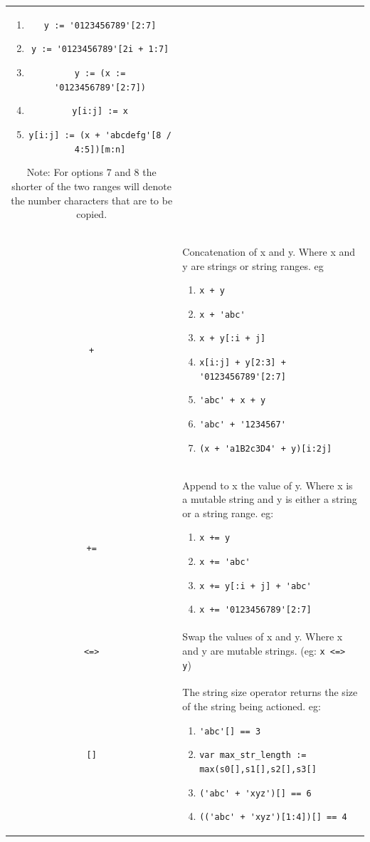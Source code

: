 \documentclass{book}
\def\lthtmlcheckvsize{\ifdim\ht\sizebox<\vsize 
  \ifdim\wd\sizebox<\hsize\expandafter\hfill\fi \expandafter\vfill
  \else\expandafter\vss\fi}%
\begin{document}
{\begin{tabular}{|c|p{}|}
\begin{enumerate}
\item\verb"y := '0123456789'[2:7]"
\item\verb"y := '0123456789'[2i + 1:7]"
\item\verb"y := (x := '0123456789'[2:7])"
\item\verb"y[i:j] := x"
\item\verb"y[i:j] := (x + 'abcdefg'[8 / 4:5])[m:n]"
\end{enumerate}
\par Note: For options 7 and 8 the shorter of the two ranges 
will denote the number characters that are to be copied.\\
\verb'+'&  Concatenation of x and y. Where x and y are strings or  
 string ranges. eg
 \begin{enumerate}
\item\verb"x + y"
\item\verb"x + 'abc'"
\item\verb"x + y[:i + j]"
\item\verb"x[i:j] + y[2:3] + '0123456789'[2:7]"
\item\verb"'abc' + x + y"
\item\verb"'abc' + '1234567'"
\item\verb"(x + 'a1B2c3D4' + y)[i:2j]"
\end{enumerate}\\
\verb'+='& Append to x the value of y. Where x is a mutable string 
and y is either a string or a string range. eg:
\begin{enumerate}
\item\verb"x += y"                  
\item\verb"x += 'abc'"              
\item\verb"x += y[:i + j] + 'abc'"
\item\verb"x += '0123456789'[2:7]"
\end{enumerate}
\\
\verb'<=>'&  Swap the values of x and y. Where x and y are mutable   
            strings.  (eg: \verb'x <=> y')\\
\verb'[]'& The string size operator returns the size of the string 
 being actioned. eg:
\begin{enumerate}
\item\verb"'abc'[] == 3"
\item\verb"var max_str_length := max(s0[],s1[],s2[],s3[]"
\item\verb"('abc' + 'xyz')[] == 6"
\item\verb"(('abc' + 'xyz')[1:4])[] == 4"
\end{enumerate}\\
  \hline
\end{tabular}%
\lthtmlfigureZ
\lthtmlcheckvsize\clearpage}
\end{document}
